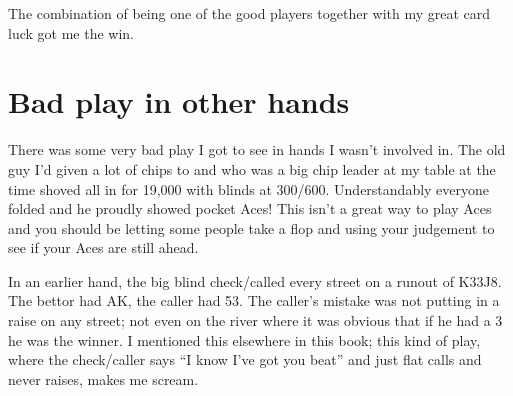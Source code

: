 The combination of being one of the good players together
with my great card luck got me the win.

\section{Bad play in other hands}

There was some very bad play I got to see in hands I wasn't involved in.
The old guy I'd given a lot of chips to and who was a big chip leader
at my table at the time shoved all in for 19,000 with blinds at 300/600.
Understandably everyone folded and he proudly showed pocket Aces! This
isn't a great way to play Aces and you should be letting some people
take a flop and using your judgement to see if your Aces are still ahead.

In an earlier hand, the big blind check/called every street on a runout
of K33J8. The bettor had AK, the caller had 53. The caller's mistake was
not putting in a raise on any street; not even on the river where it
was obvious that if he had a 3 he was the winner. I mentioned this
elsewhere in this book; this kind of play, where the check/caller says
``I know I've got you beat'' and just flat calls and never raises,
makes me scream.
